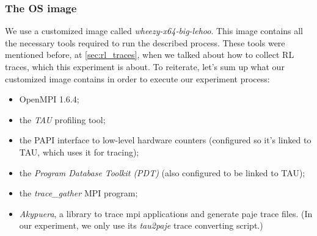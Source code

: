 \subsubsection{The OS image}
\label{sec:image}
We use a customized image called
\emph{wheezy-x64-big-lehoo}. This image contains all the necessary
tools required to run the described process. These tools were
mentioned before, at \ref{sec:rl_traces}, when we talked about how to
collect RL traces, which this experiment is about. To reiterate, let's
sum up what our customized image contains in order to execute our
experiment process:
\begin{itemize}
\item OpenMPI 1.6.4;
\item the \emph{TAU}\cite{sm06} profiling tool;
\item the PAPI\cite{mbdh99}\cite{lmmsl01} interface to low-level
hardware counters (configured so it's linked to TAU, which uses it for
tracing);
\item the \emph{Program Database Toolkit (PDT)}\cite{lcmsmrr00} (also
configured to be linked to TAU);
\item the \emph{trace\_gather}\cite{ms11} MPI program;
\item \emph{Akypuera}\cite{s13}, a library to trace mpi applications
and generate paje trace files. (In our experiment, we only use
its \emph{tau2paje} trace converting script.)
\end{itemize}
